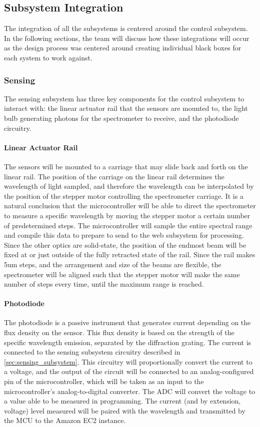 \subsection{Subsystem Integration}
\label{sec:subsystem_integration}
The integration of all the subsystems is centered around the control subsystem. In the following sections, the team will discuss how these integrations will occur as the design process was centered around creating individual black boxes for each system to work against.

\subsubsection{Sensing}

The sensing subsystem has three key components for the control subsystem to interact with: the linear actuator rail that the sensors are mounted to, the light bulb generating photons for the spectrometer to receive, and the photodiode circuitry.

\paragraph{Linear Actuator Rail} The sensors will be mounted to a carriage that may slide back and forth on the linear rail. The position of the carriage on the linear rail determines the wavelength of light sampled, and therefore the wavelength can be interpolated by the position of the stepper motor controlling the spectrometer carriage. It is a natural conclusion that the microcontroller will be able to direct the spectrometer to measure a specific wavelength by moving the stepper motor a certain number of predetermined steps. The microcontroller will sample the entire spectral range and compile this data to prepare to send to the web subsystem for processing. Since the other optics are solid-state, the position of the endmost beam will be fixed at or just outside of the fully retracted state of the rail. Since the rail makes 5um steps, and the arrangement and size of the beams are flexible, the spectrometer will be aligned such that the stepper motor will make the same number of steps every time, until the maximum range is reached.

\paragraph{Photodiode} The photodiode is a passive instrument that generates current depending on the flux density on the sensor. This flux density is based on the strength of the specific wavelength emission, separated by the diffraction grating. The current is connected to the sensing subsystem circuitry described in \ref{sec:sensing_subsystem}. This circuitry will proportionally convert the current to a voltage, and the output of the circuit will be connected to an analog-configured pin of the microcontroller, which will be taken as an input to the microcontroller's analog-to-digital converter. The ADC will convert the voltage to a value able to be measured in programming. The current (and by extension, voltage) level measured will be paired with the wavelength and transmitted by the MCU to the Amazon EC2 instance.


